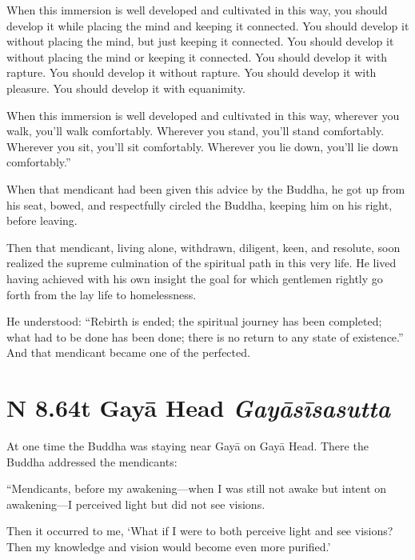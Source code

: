\documentclass[12pt,openany]{book}%
\newcommand*{\suttatitleacronym}[1]{\smaller[2]{#1}\vspace*{.3em}}
\newcommand*{\suttatitletranslation}[1]{\linebreak{#1}}
\newcommand*{\suttatitleroot}[1]{\linebreak\smaller[2]\itshape{#1}}
\newcommand*{\tocacronym}[1]{\hspace*{-3.3em}{#1}\quad}
\newcommand*{\toctranslation}[1]{#1}
\newcommand*{\tocroot}[1]{(\textit{#1})}
\begin{document}
When this immersion is well developed and cultivated in this way, you should develop it while placing the mind and keeping it connected. You should develop it without placing the mind, but just keeping it connected. You should develop it without placing the mind or keeping it connected. You should develop it with rapture. You should develop it without rapture. You should develop it with pleasure. You should develop it with equanimity. 

When this immersion is well developed and cultivated in this way, wherever you walk, you’ll walk comfortably. Wherever you stand, you’ll stand comfortably. Wherever you sit, you’ll sit comfortably. Wherever you lie down, you’ll lie down comfortably.” 

When that mendicant had been given this advice by the Buddha, he got up from his seat, bowed, and respectfully circled the Buddha, keeping him on his right, before leaving. 

Then that mendicant, living alone, withdrawn, diligent, keen, and resolute, soon realized the supreme culmination of the spiritual path in this very life. He lived having achieved with his own insight the goal for which gentlemen rightly go forth from the lay life to homelessness. 

He understood: “Rebirth is ended; the spiritual journey has been completed; what had to be done has been done; there is no return to any state of existence.” And that mendicant became one of the perfected. 

%
\section*{{\suttatitleacronym AN 8.64}{\suttatitletranslation At Gayā Head }{\suttatitleroot Gayāsīsasutta}}
\addcontentsline{toc}{section}{\tocacronym{AN 8.64} \toctranslation{At Gayā Head } \tocroot{Gayāsīsasutta}}

At one time the Buddha was staying near \textsanskrit{Gayā} on \textsanskrit{Gayā} Head. There the Buddha addressed the mendicants: 

“Mendicants, before my awakening—when I was still not awake but intent on awakening—I perceived light but did not see visions. 

Then it occurred to me, ‘What if I were to both perceive light and see visions? Then my knowledge and vision would become even more purified.’ 
\end{document}
